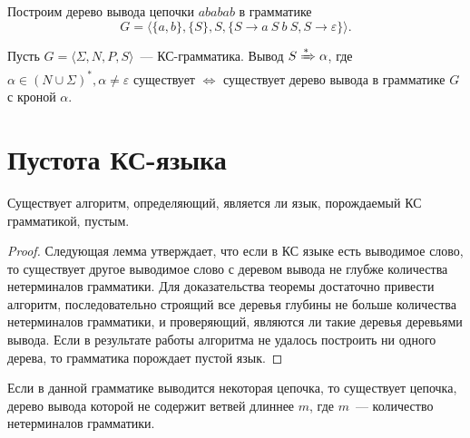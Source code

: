 \begin{example}
    Построим дерево вывода цепочки $ababab$ в грамматике
    \[ G = \langle \{a,b\}, \{S\}, S, \{S \to a \ S \ b \ S, S \to \varepsilon\} \rangle.\]
    \begin{center}
        
    \end{center}
\end{example}

\begin{theorem}
    Пусть $G = \langle \Sigma, N, P, S \rangle$~--- КС-грамматика.
    Вывод $S \xRightarrow[]{*} \alpha$, где $\alpha \in (N \cup \Sigma)^*, \alpha \neq \varepsilon$ существует $\Leftrightarrow$ существует дерево вывода в грамматике $G$ с кроной $\alpha$.
\end{theorem}

\section{Пустота КС-языка}

\begin{theorem}
    Существует алгоритм, определяющий, является ли язык, порождаемый КС грамматикой, пустым.
\end{theorem}

\begin{proof}
    Следующая лемма утверждает, что если в КС языке есть выводимое слово, то существует другое выводимое слово с деревом вывода не глубже количества нетерминалов грамматики.
    Для доказательства теоремы достаточно привести алгоритм, последовательно строящий все деревья глубины не больше количества нетерминалов грамматики, и проверяющий, являются ли такие деревья деревьями вывода.
    Если в результате работы алгоритма не удалось построить ни одного дерева, то грамматика порождает пустой язык.
\end{proof}

\begin{lemma}
    Если в данной грамматике выводится некоторая цепочка, то существует цепочка, дерево вывода которой не содержит ветвей длиннее $m$, где $m$~--- количество нетерминалов грамматики.
\end{lemma}

